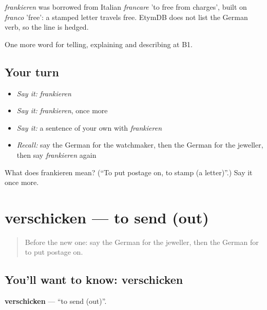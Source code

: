 \begin{cousinweb}
\emph{frankieren} was borrowed from Italian \emph{francare} 'to free from charges', built on \emph{franco} 'free': a stamped letter travels free. EtymDB does not list the German verb, so the line is hedged.
\end{cousinweb}

\begin{grammarlens}[title={What you've built}]
One more word for telling, explaining and describing at B1.
\end{grammarlens}

\subsection*{Your turn}
\begin{itemize}
\raggedright
  \item \emph{Say it:} \emph{frankieren}
  \item \emph{Say it:} \emph{frankieren}, once more
  \item \emph{Say it:} a sentence of your own with \emph{frankieren}
  \item \emph{Recall:} say the German for the watchmaker, then the German for the jeweller, then say \emph{frankieren} again
\end{itemize}

\begin{tcolorbox}[breakable,colback=teal!4,colframe=teal!35!black,title={Before you move on}]
What does frankieren mean? (\textquotedblleft{}To put postage on, to stamp (a letter)\textquotedblright{}.) Say it once more.
\end{tcolorbox}
\section[verschicken]{verschicken — to send (out)}

\label{lesson:GE-C448-verschicken}



\begin{quote}
Before the new one: say the German for the jeweller, then the German for to put postage on.
\end{quote}

\subsection*{You'll want to know: verschicken}
\textbf{verschicken} — \textquotedblleft{}to send (out)\textquotedblright{}.

